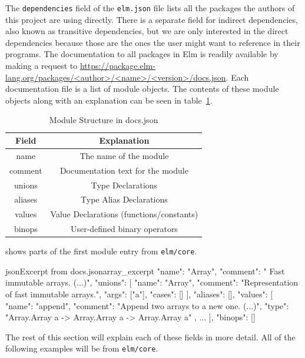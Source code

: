 \documentclass[../thesis.tex]{subfiles}
\begin{document}
The \texttt{dependencies} field of the \texttt{elm.json} file lists all the packages the authors of this project
are using directly.
There is a separate field for indirect dependencies, also known as transitive dependencies, 
but we are only interested in the direct dependencies because those are the ones the user might want to
reference in their programs.
The documentation to all packages in Elm is readily available by making a request to
\url{https://package.elm-lang.org/packages/<author>/<name>/<version>/docs.json}.
Each documentation file is a list of module objects.
The contents of these module objects along with an explanation can be seen in table~\ref{tab:documentation_fields}.

\begin{table}[htpb]
    \centering
    \begin{tabular}{|c|c|}
        \hline
        Field & Explanation \\
        \hline
        name & The name of the module \\
        comment & Documentation text for the module \\
        unions & Type Declarations \\
        aliases & Type Alias Declarations \\
        values & Value Declarations (functions/constants) \\
        binops & User-defined binary operators \\
        \hline
    \end{tabular}
    \caption{Module Structure in docs.json}
    \label{tab:documentation_fields}
\end{table}


 shows parts of the first module entry from \texttt{elm/core}.
\begin{code}{json}{Excerpt from docs.json}{array_excerpt}
  {
    "name": "Array",
    "comment": " Fast immutable arrays. (...)",
    "unions": [
      {
        "name": "Array",
        "comment": "Representation of fast immutable arrays.",
        "args": ["a"],
        "cases": []
      }
    ],
    "aliases": [],
    "values": [
      {
        "name": "append",
        "comment": "Append two arrays to a new one. (...)",
        "type": 
            "Array.Array a -> Array.Array a -> Array.Array a"
      },
      ...
    ],
    "binops": []
  }
\end{code}
The rest of this section will explain each of these fields in more detail.
All of the following examples will be from \texttt{elm/core}.
\end{document}

